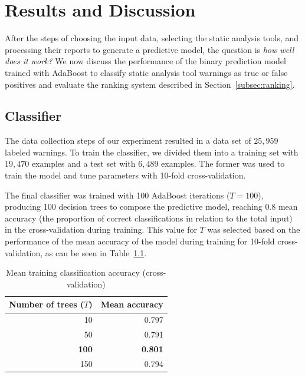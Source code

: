 \chapter{Results and Discussion}
\label{ch:results}
\FloatBarrier

After the steps of choosing the input data, selecting the static analysis
tools, and processing their reports to generate a predictive model, the question is \emph{how well does
it work?} We now
discuss the performance of the binary prediction model trained with
AdaBoost to classify static analysis tool warnings as true or false positives and
evaluate the ranking system described in Section~\ref{subsec:ranking}.

\section{Classifier}
\label{sec:results_classifier}

The data collection steps of our experiment resulted in a data set of $25,959$ labeled
warnings. To train the classifier, we divided them
into a training set with $19,470$ examples and a test set with $6,489$
examples. The former was used to train the model and tune parameters with 
10-fold cross-validation.

The final classifier was trained with 100 AdaBoost iterations ($T = 100$),
producing 100 decision trees to compose the predictive model, reaching $0.8$
mean accuracy (the proportion of correct classifications in relation to the total input)
in the cross-validation during training. This value for $T$ was
selected based on the performance of the mean accuracy of the model during training for 10-fold
cross-validation, as can be seen in Table~\ref{tab:mean_acc}.

  \begin{table}
    \begin{center}
        \begin{tabular}{rr}\hline
          Number of trees ($T$) & Mean accuracy \\
        \hline
          10 & 0.797 \\
          50 & 0.791 \\
          \textbf{100} & \textbf{0.801} \\
          150 & 0.794 \\ \hline
        \end{tabular}
        \caption{Mean training classification accuracy (cross-validation)}\label{tab:mean_acc}
    \end{center}
\end{table}


